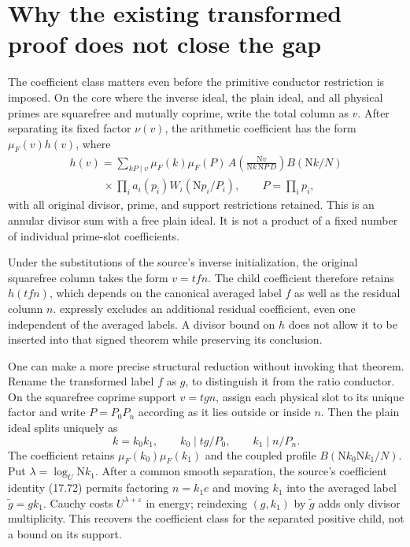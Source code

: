 \documentclass[11pt]{article}
\theoremstyle{definition}
\theoremstyle{remark}
\numberwithin{equation}{section}
\newcommand{\Nm}{\mathrm N}
\newcommand{\ee}{\varepsilon}
\begin{document}
\section{Why the existing transformed proof does not close the gap}
\label{sec:obstruction}

The coefficient class matters even before the primitive conductor
restriction is imposed. On the core where the inverse ideal, the
plain ideal, and all physical primes are squarefree and mutually
coprime, write the total column as $v$. After separating its fixed
factor $\nu(v)$, the arithmetic coefficient has the form
$\mu_F(v)h(v)$, where
\begin{equation}\label{eq:h}
\begin{split}
h(v)=\sum_{kP\mid v}\mu_F(k)\mu_F(P)\,
A\!\left(\frac{\Nm v}{\Nm k\,\Nm P\,D}\right)B(\Nm k/N)\\
\hspace{3em}{}\times\prod_i a_i(p_i)W_i(\Nm p_i/P_i),
\qquad P=\prod_i p_i,
\end{split}
\end{equation}
with all original divisor, prime, and support restrictions retained.
This is an annular divisor sum with a free plain ideal. It is not
a product of a fixed number of individual prime-slot coefficients.

Under the substitutions of the source's inverse initialization,
the original squarefree column takes the form $v=tfn$.
The child coefficient therefore retains $h(tfn)$, which depends on
the canonical averaged label $f$ as well as the residual column $n$.
\cite[Lemma 17.2]{openai} expressly excludes an additional residual
coefficient, even one independent of the averaged labels.
A divisor bound on $h$ does not allow it to be inserted into that
signed theorem while preserving its conclusion.

One can make a more precise structural reduction without invoking that
theorem. Rename the transformed label $f$ as $g$, to distinguish it
from the ratio conductor. On the squarefree coprime support $v=tgn$,
assign each physical slot to its unique factor and write $P=P_0P_n$
according as it lies outside or inside $n$. Then the plain ideal splits
uniquely as
\[
k=k_0k_1,\qquad k_0\mid tg/P_0,\qquad k_1\mid n/P_n.
\]
The coefficient retains $\mu_F(k_0)\mu_F(k_1)$ and the coupled
profile $B(\Nm k_0\Nm k_1/N)$. Put $\lambda=\log_U\Nm k_1$.
After a common smooth separation, the source's coefficient identity
(17.72) permits factoring $n=k_1e$ and moving $k_1$ into the averaged
label $\widetilde g=gk_1$. Cauchy costs $U^{\lambda+\ee}$ in energy;
reindexing $(g,k_1)$ by $\widetilde g$ adds only divisor multiplicity.
This recovers the coefficient class for the separated positive child,
not a bound on its support.
\end{document}
